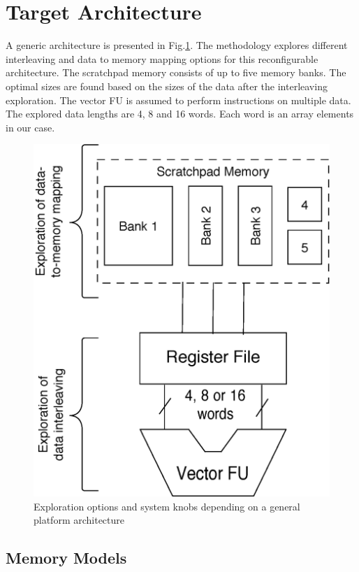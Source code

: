 \documentclass[prodmode,acmtodaes]{acmsmall}
\begin{document}
\section{Target Architecture}

A generic architecture is presented in Fig.\ref{arch}.
The methodology explores different interleaving and data to memory mapping options for this reconfigurable architecture.
The scratchpad memory consists of up to five memory banks. 
The optimal sizes are found based on the sizes of the data after the interleaving exploration.
The vector FU is assumed to perform instructions on multiple data.
The explored data lengths are 4, 8 and 16 words.
Each word is an array elements in our case. 

\begin{figure}
\centering
	\label{arch}
	\caption{Exploration options and system knobs depending on a general platform architecture}
	\includegraphics[scale = 0.5]{Images/Architecture.eps} 
\end{figure}

\subsection{Memory Models}
\end{document}
